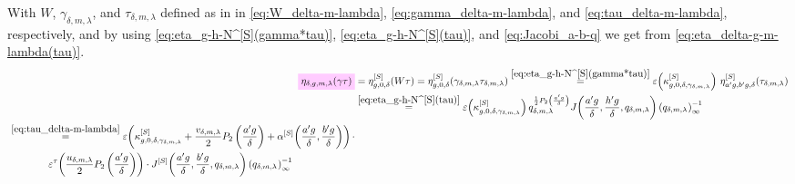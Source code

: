 \documentclass{article}
\begin{document}
With $W$, $\gamma_{\delta,m,\lambda}$, and $\tau_{\delta,m,\lambda}$
defined as in in \eqref{eq:W_delta-m-lambda},
\eqref{eq:gamma_delta-m-lambda}, and \eqref{eq:tau_delta-m-lambda},
respectively, and by using \eqref{eq:eta_g-h-N^[S](gamma*tau)},
\eqref{eq:eta_g-h-N^[S](tau)}, and \eqref{eq:Jacobi_a-b-q} we get from
\eqref{eq:eta_delta-g-m-lambda(tau)}.
\begin{align}
  \defineNotation[eta-delta-g-m-lambda-gamma-tau-Robins]
    {\eta_{\delta,g,m,\lambda}(\gamma\tau)}
  &=
    \eta_{g,0,\delta}^{[S]}(W\tau)
  =
    \eta_{g,0,\delta}^{[S]}(\gamma_{\delta,m,\lambda}\tau_{\delta,m,\lambda})
   \eqby{eq:eta_g-h-N^[S](gamma*tau)}
    \unityPower{\kappa_{g,0,\delta,\gamma_{\delta,m,\lambda}}^{[S]}}\,
    \eta_{a' g, b' g,\delta}^{[S]}(\tau_{\delta,m,\lambda})
  \notag\\
  &\eqby{eq:eta_g-h-N^[S](tau)}
    \unityPower{\kappa_{g,0,\delta,\gamma_{\delta,m,\lambda}}^{[S]}}
  q_{\delta,m,\lambda}^{\frac{1}{2} P_2
    \left(\frac{a'g}{\delta}\right)}
    \jacobiAlpha{\frac{a' g}{\delta}}{\frac{h' g}{\delta}}{q_{\delta,m,\lambda}}
    \eulerFunction[q_{\delta,m,\lambda}]{}^{-1}
    \notag\\
  \begin{split}
    &\eqby{eq:tau_delta-m-lambda}
    \unityPower{
      \kappa_{g,0,\delta,\gamma_{\delta,m,\lambda}}^{[S]}
      +
      \frac{v_{\delta,m,\lambda}}{2} P_2\left(\frac{a' g}{\delta}\right)
      +
      \alphaSchoenebergContribution{\frac{a' g}{\delta}}{\frac{b' g}{\delta}}
    }
    \cdot
    \\
    &\qquad\qquad
    \unityPowerTau{
      \frac{u_{\delta,m,\lambda}}{2} P_2\left(\frac{a' g}{\delta}\right)}
    \cdot
    \jacobiSchoeneberg{\frac{a' g}{\delta}}{\frac{b' g}{\delta}}{q_{\delta,m,\lambda}}
    \eulerFunction[q_{\delta,m,\lambda}]{}^{-1}
  \end{split}
  \label{eq:eta_delta-g-m-lambda^[R](gamma*tau)}
\end{align}
\end{document}
